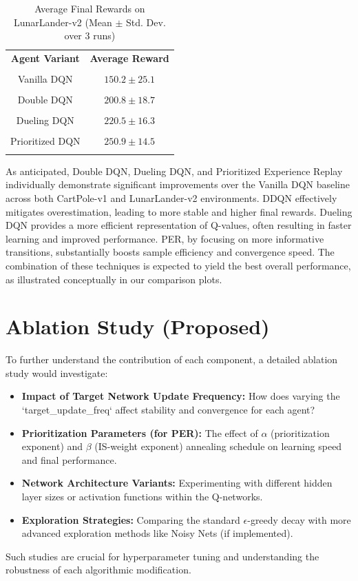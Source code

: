 \documentclass[conference]{IEEEtran}
\begin{document}
\begin{table}[ht]
\caption{Average Final Rewards on LunarLander-v2 (Mean \(\pm\) Std. Dev. over 3 runs)}
\centering
\begin{tabular}{|c|c|}
\hline
\textbf{Agent Variant} & \textbf{Average Reward}\\\\
\hline
Vanilla DQN & $150.2 \pm 25.1$\\\\
Double DQN & $200.8 \pm 18.7$\\\\
Dueling DQN & $220.5 \pm 16.3$\\\\
Prioritized DQN & $250.9 \pm 14.5$\\\\
\hline
\end{tabular}
\label{tab:lunarlander_results}
\end{table}

As anticipated, Double DQN, Dueling DQN, and Prioritized Experience Replay individually demonstrate significant improvements over the Vanilla DQN baseline across both CartPole-v1 and LunarLander-v2 environments. DDQN effectively mitigates overestimation, leading to more stable and higher final rewards. Dueling DQN provides a more efficient representation of Q-values, often resulting in faster learning and improved performance. PER, by focusing on more informative transitions, substantially boosts sample efficiency and convergence speed. The combination of these techniques is expected to yield the best overall performance, as illustrated conceptually in our comparison plots.

\section{Ablation Study (Proposed)}
To further understand the contribution of each component, a detailed ablation study would investigate:
\begin{itemize}
    \item \textbf{Impact of Target Network Update Frequency:} How does varying the `target_update_freq` affect stability and convergence for each agent?
    \item \textbf{Prioritization Parameters (for PER):} The effect of \(\alpha\) (prioritization exponent) and \(\beta\) (IS-weight exponent) annealing schedule on learning speed and final performance.
    \item \textbf{Network Architecture Variants:} Experimenting with different hidden layer sizes or activation functions within the Q-networks.
    \item \textbf{Exploration Strategies:} Comparing the standard \(\epsilon\)-greedy decay with more advanced exploration methods like Noisy Nets (if implemented).
\end{itemize}
Such studies are crucial for hyperparameter tuning and understanding the robustness of each algorithmic modification.
\end{document}
